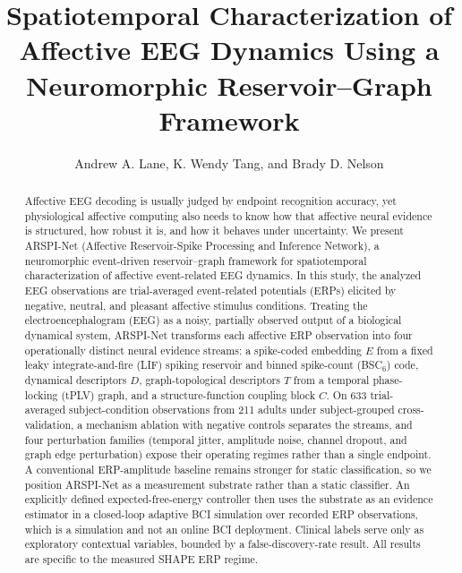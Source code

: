 \documentclass[journal]{IEEEtran}
\begin{document}
\title{Spatiotemporal Characterization of Affective EEG Dynamics Using a Neuromorphic Reservoir--Graph Framework}

\author{Andrew A. Lane, K. Wendy Tang, and Brady D. Nelson}

\maketitle

\begin{abstract}
Affective EEG decoding is usually judged by endpoint recognition accuracy, yet physiological affective computing also needs to know how that affective neural evidence is structured, how robust it is, and how it behaves under uncertainty. We present ARSPI-Net (Affective Reservoir-Spike Processing and Inference Network), a neuromorphic event-driven reservoir--graph framework for spatiotemporal characterization of affective event-related EEG dynamics. In this study, the analyzed EEG observations are trial-averaged event-related potentials (ERPs) elicited by negative, neutral, and pleasant affective stimulus conditions. Treating the electroencephalogram (EEG) as a noisy, partially observed output of a biological dynamical system, ARSPI-Net transforms each affective ERP observation into four operationally distinct neural evidence streams: a spike-coded embedding $E$ from a fixed leaky integrate-and-fire (LIF) spiking reservoir and binned spike-count (BSC$_6$) code, dynamical descriptors $D$, graph-topological descriptors $T$ from a temporal phase-locking (tPLV) graph, and a structure-function coupling block $C$. On 633 trial-averaged subject-condition observations from 211 adults under subject-grouped cross-validation, a mechanism ablation with negative controls separates the streams, and four perturbation families (temporal jitter, amplitude noise, channel dropout, and graph edge perturbation) expose their operating regimes rather than a single endpoint. A conventional ERP-amplitude baseline remains stronger for static classification, so we position ARSPI-Net as a measurement substrate rather than a static classifier. An explicitly defined expected-free-energy controller then uses the substrate as an evidence estimator in a closed-loop adaptive BCI simulation over recorded ERP observations, which is a simulation and not an online BCI deployment. Clinical labels serve only as exploratory contextual variables, bounded by a false-discovery-rate result. All results are specific to the measured SHAPE ERP regime.
\end{abstract}
\end{document}
